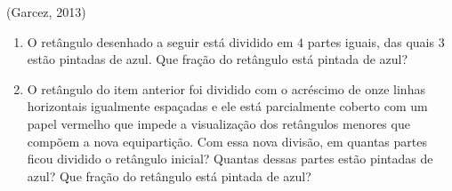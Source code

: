 \begin{atividade}{}

(Garcez, 2013)

\begin{enumerate} [\quad a)] %
  \item     O retângulo desenhado a seguir está dividido em     $4$ partes iguais, das quais     $3$ estão pintadas de azul. Que fração do retângulo está pintada de azul?
  \begin{center}
\end{center}

\item     O retângulo do item anterior foi dividido com o acréscimo de onze linhas horizontais igualmente espaçadas e ele está parcialmente coberto com um papel vermelho que impede a visualização dos retângulos menores que compõem a nova equipartição. Com essa nova divisão, em quantas partes ficou dividido o retângulo inicial? Quantas dessas partes estão pintadas de azul? Que fração do retângulo está pintada de azul?     \mbox{} \newline
\end{enumerate} %

\begin{center}
\end{center}
\end{atividade}
\clearpage

